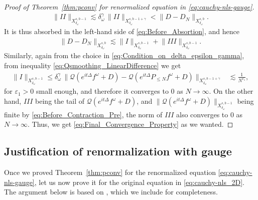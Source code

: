 \documentclass[11pt, xcolor = dvipsnames,reqno
]{amsart}
\theoremstyle{definition}
\theoremstyle{remark}
\begin{document}
\begin{proof}[Proof of Theorem~\ref{thm:pconv} for renormalized equation in \eqref{eq:cauchy-nls-gauge}]
    \begin{align*}
        \| II \|_{X^{s,b-1}_{\delta_{\omega}}}
        \lesssim 
        \delta_{\omega}^{\gamma} \, 
        \| II \|_{X^{s,b-1+\gamma}_{\delta_{\omega}}} 
        <  \|D - D_N\|_{X^{s,b}_{\delta_{\omega}}}.
    \end{align*}
    It is thus absorbed in the left-hand side of \eqref{eq:Before_Absortion}, and hence 
    \begin{align}\label{eq:After_Absortion}
        \|  D - D_N \|_{X^{s,b}_{\delta_{\omega}}} 
        \lesssim  \big\|  I \big\|_{X^{s,b-1}_{\delta_{\omega}}} + \big\|  III \big\|_{X^{s,b-1}_{\delta_{\omega}}}.
    \end{align}
    Similarly, again from the choice in \eqref{eq:Condition_on_delta_epsilon_gamma}, from inequality \eqref{eq:Qsmoothing_LinearDifference} we get
    \begin{align}
        \| I \|_{X^{s,b-1}_{\delta_{\omega}}}
        \leq \delta_\omega^\gamma \,  \big\|   \mathcal{Q}(e^{it\Delta}  f^{\omega} + D) - \mathcal{Q}(e^{it\Delta} P_{\leq N} f^{\omega} + D) \big\|_{X^{s,b-1+\gamma}_{\delta_{\omega}}}
        & \lesssim  \frac{1}{N^{\varepsilon_1}},
    \end{align}
    for $\varepsilon_1 > 0$ small enough, 
    and therefore it converges to $0$ as $N \rightarrow \infty$. 
    On the other hand, 
    $III$ being the tail of 
    $\mathcal{Q}(e^{it\Delta}  f^{\omega} + D)$,  and $\| \mathcal{Q}(e^{it\Delta}  f^{\omega} + D) \|_{X^{s, b-1}_{\delta_{\omega}}}$ being finite by \eqref{eq:Before_Contraction_Pre}, 
    the norm of $III$ also converges to $0$ as $N \rightarrow \infty$. Thus, we get \eqref{eq:Final_Convergence_Property} as we wanted. 
    \end{proof}




\subsection{Justification of renormalization with gauge}\label{sec:renorm}
Once we proved Theorem~\ref{thm:pconv} for the renormalized equation \eqref{eq:cauchy-nls-gauge}, let us now prove it for the original equation in \eqref{eq:cauchy-nls_2D}. 
The argument below is based on \cite{Staffilani1997}, which we include for completeness. 
\end{document}

